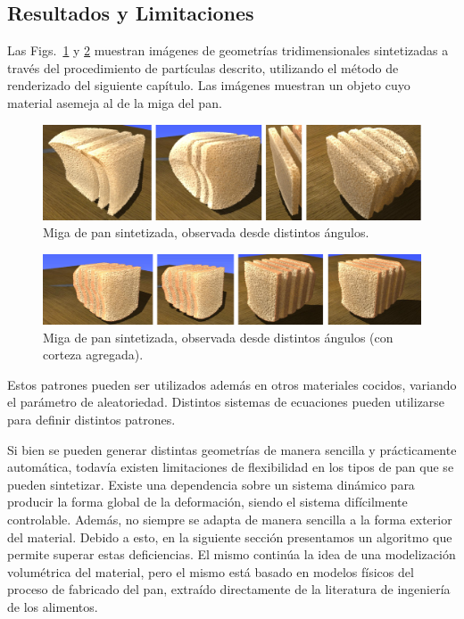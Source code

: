 \subsection{Resultados y Limitaciones}
Las Figs.~\ref{fg:crumb} y \ref{fg:results2} muestran imágenes de geometrías tridimensionales sintetizadas a través del procedimiento de partículas descrito, utilizando el método de renderizado del siguiente capítulo.
Las imágenes muestran un objeto cuyo material asemeja al de la miga del pan.

\begin{figure}
  \centerline{\includegraphics[width=13cm]{figures/crumb}}
  \caption{Miga de pan sintetizada, observada desde distintos ángulos.}
  \label{fg:crumb}
\end{figure}


\begin{figure}
  \centerline{\includegraphics[width=13cm]{figures/results2}}
  \caption{Miga de pan sintetizada, observada desde distintos ángulos (con corteza agregada).}
  \label{fg:results2}
\end{figure}

Estos patrones pueden ser utilizados adem\'as en otros materiales cocidos, variando el par\'ametro de aleatoriedad.
Distintos sistemas de ecuaciones pueden utilizarse para definir distintos patrones.

Si bien se pueden generar distintas geometrías de manera sencilla y prácticamente automática, todavía existen limitaciones de flexibilidad en los tipos de pan que se pueden sintetizar.
Existe una dependencia sobre un sistema dinámico para producir la forma global de la deformación, siendo el sistema difícilmente controlable.
Además, no siempre se adapta de manera sencilla a la forma exterior del material.
Debido a esto, en la siguiente sección presentamos un algoritmo que permite superar estas deficiencias.
El mismo continúa la idea de una modelización volumétrica del material, pero el mismo está basado en modelos físicos del proceso de fabricado del pan, extraído directamente de la literatura de ingeniería de los alimentos.

